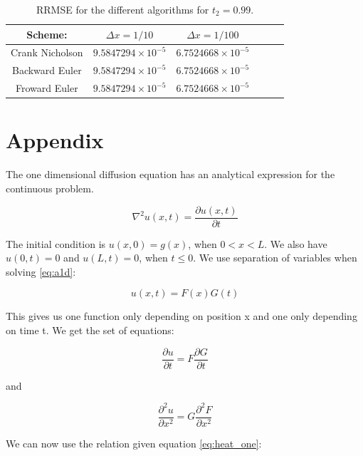 \documentclass{article}
\begin{document}
\begin{table}[H]
\begin{center}
\caption{RRMSE for the different algorithms for $t_2=0.99$.}
\begin{tabular}{  |c|c|c|c|c|c| } \hline
Scheme:&	$\Delta x =1/10$&$\Delta x = 1/100$ \\ \hline
Crank Nicholson&$9.5847294\times 10^{-5}$&$6.7524668\times10^{-5}$\\ \hline
Backward Euler&$9.5847294\times 10^{-5}$&$6.7524668\times10^{-5}$\\ \hline
Froward Euler&$9.5847294\times 10^{-5}$&$6.7524668\times10^{-5}$\\ \hline
\end{tabular}
\label{tab:error2}
\end{center}
\end{table}


\section{Appendix}

The one dimensional diffusion equation has an analytical expression for the continuous problem. 

\begin{equation}
\nabla ^2 u(x,t)=\frac{\partial u(x,t)}{\partial t}
\label{eq:a1d}
\end{equation}

The initial condition is $u(x,0)=g(x)$, when $0<x<L$. We also have $u(0,t)=0$ and $u(L,t)=0$, when $t\leq0$. We use separation of variables when solving \ref{eq:a1d}:

\begin{equation}
u(x,t) = F(x)G(t)
\label{eq:sep}
\end{equation}

This gives us one function only depending on position x and one only depending on time t. We get the set of equations:

\begin{equation*}
\frac{\partial u}{\partial t} = F \frac{\partial G}{\partial t}
\end{equation*}

and

\begin{equation*}
\frac{\partial^2 u}{\partial x^2} = G \frac{\partial^2 F}{\partial x^2}
\end{equation*}

We can now use the relation given equation \ref{eq:heat_one}:
\end{document}
